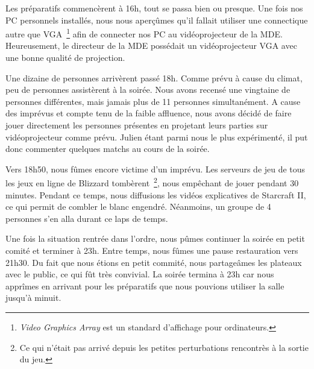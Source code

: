 Les préparatifs commencèrent à 16h, tout se passa bien ou presque. Une fois nos PC personnels
installés, nous nous aperçûmes qu’il fallait utiliser une connectique autre que VGA\, \footnote{\emph{Video Graphics
Array} est un standard d'affichage pour ordinateurs.} afin de
connecter nos PC au vidéoprojecteur de la MDE. Heureusement, le
directeur de la MDE 
possédait un vidéoprojecteur VGA avec une bonne qualité de projection.

Une dizaine de personnes arrivèrent passé 18h. Comme prévu à cause du climat, peu de
personnes assistèrent à la soirée. Nous avons recensé une vingtaine de personnes
différentes, mais jamais plus de 11 personnes simultanément.
A cause des imprévus et compte tenu de la faible affluence, nous avons décidé de faire jouer
directement les personnes présentes en projetant leurs parties sur vidéoprojecteur comme
prévu. Julien étant parmi nous le plus expérimenté, il put donc commenter quelques matchs
au cours de la soirée.

Vers 18h50, nous fûmes encore victime d’un imprévu. Les serveurs de jeu de tous les jeux en
ligne de Blizzard tombèrent\, \footnote{Ce qui n'était pas arrivé depuis
les petites perturbations rencontrès à la sortie du jeu.}, nous empêchant de jouer pendant 30 minutes. Pendant ce
temps, nous diffusions les vidéos explicatives de Starcraft II, ce qui permit de combler le
blanc engendré. Néanmoins, un groupe de 4 personnes s’en alla durant ce laps de temps.

Une fois la situation rentrée dans l’ordre, nous pûmes continuer la soirée en petit comité et
terminer à 23h. Entre temps, nous fûmes une pause restauration vers
21h30. Du fait que nous étions en petit commité, nous
partageâmes les plateaux avec le public, ce qui fût très
convivial. La soirée termina à 23h car nous apprîmes en arrivant pour les préparatifs
que nous pouvions utiliser la salle jusqu’à minuit.

